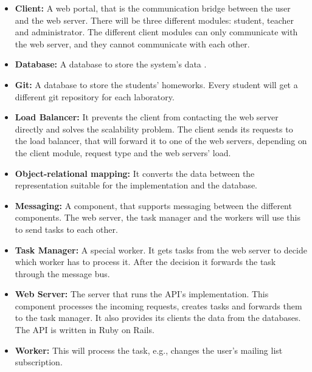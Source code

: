 \begin{itemize}
	\item \textbf{Client:} A web portal, that is the communication bridge between the user and the web server. There will be three different modules: student, teacher and administrator. The different client modules can only communicate with the web server, and they cannot communicate with each other.
	\item \textbf{Database:} A database to store the system's data . 
	\item \textbf{Git:} A database to store the students' homeworks. Every student will get a different git repository for each laboratory.
	\item \textbf{Load Balancer:} It prevents the client from contacting the web server directly and solves the scalability problem. The client sends its requests to the load balancer, that will forward it to one of the web servers, depending on the client module, request type and the web servers' load.
	\item \textbf{Object-relational mapping:} It converts the data between the representation suitable for the implementation and the database. 
	\item \textbf{Messaging:} A component, that supports messaging between the different components. The web server, the task manager and the workers will use this to send tasks to each other.
	\item \textbf{Task Manager:} A special worker. It gets tasks from the web server to decide which worker has to process it. After the decision it forwards the task through the message bus.
	\item \textbf{Web Server:} The server that runs the API's implementation. This component processes the incoming requests, creates tasks and forwards them to the task manager. It also provides its clients the data from the databases. The API is written in Ruby on Rails. 
	\item \textbf{Worker:} This will process the task, e.g., changes the user's mailing list subscription.
\end{itemize}


